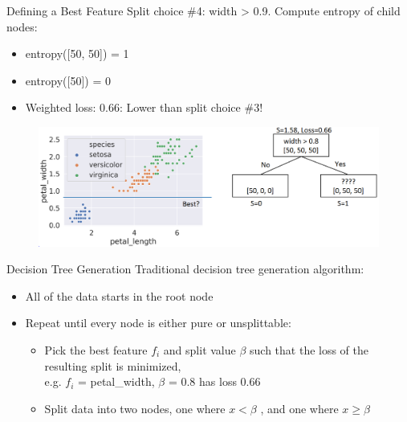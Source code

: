 \documentclass[aspectratio=169]{../latex_main/tntbeamer}  %
\begin{document}
	
	\begin{frame}{Defining a Best Feature}
 	    Split choice \#4: width > 0.9. Compute entropy of child nodes:
	    \begin{itemize}
	        \item entropy([50, 50]) = 1
	        \item entropy([50]) = 0
	        \item Weighted loss: 0.66: \alert{Lower than split choice \#3!}

	    \end{itemize}
	    
	    \begin{figure}
	        \centering
	        \includegraphics[scale=.4]{figure_tree/Bild51}
	    \end{figure}
	\end{frame}
	
	
	\begin{frame}[c]{Decision Tree Generation}
	    Traditional decision tree generation algorithm: 
	    \begin{itemize}
	        \item All of the data starts in the root node
	        \item Repeat until every node is either pure or unsplittable:
	        \begin{itemize}
	            \item Pick the best feature $f_i$ and split value $\beta$ such that the loss of the resulting split is minimized,\\ e.g. $f_i$ = petal\_width, $\beta$ = 0.8 has loss 0.66
	            \item Split data into two nodes, one where $x < \beta$ , and one where $x \geq \beta$ 
	        \end{itemize}
	    \end{itemize}

	\end{frame}
\end{document}
